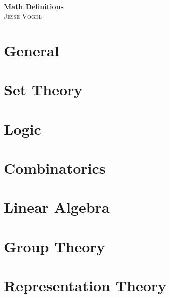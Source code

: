\documentclass{report}
\begin{document}
\thispagestyle{empty}

\begin{center}
    \; \\ \vspace{4cm} \textbf{\Huge Math Definitions}
    \\ \vspace{2cm}
    \textsc{Jesse Vogel}
\end{center}

\newpage

{
    \tableofcontents
}

\newcommand{\cat}{}

\chapter{General}
\renewcommand{\cat}{GM}


\chapter{Set Theory}
\renewcommand{\cat}{ST}



\chapter{Logic}
\renewcommand{\cat}{LO}


\chapter{Combinatorics}
\renewcommand{\cat}{CO}



\chapter{Linear Algebra}
\renewcommand{\cat}{LA}







\chapter{Group Theory}
\renewcommand{\cat}{GT}


\chapter{Representation Theory}
\renewcommand{\cat}{RT}

\end{document}
